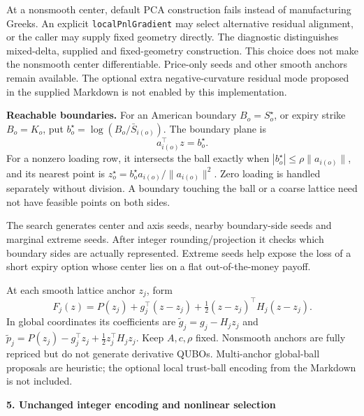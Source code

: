 \documentclass[11pt,a4paper]{article}
\begin{document}
At a nonsmooth center, default PCA construction fails instead of manufacturing
Greeks. An explicit \texttt{localPnlGradient} may select alternative residual
alignment, or the caller may supply fixed geometry directly. The diagnostic
distinguishes mixed-delta, supplied and fixed-geometry construction. This choice
does not make the nonsmooth center differentiable. Price-only seeds and other
smooth anchors remain available. The optional extra negative-curvature residual
mode proposed in the supplied Markdown is not enabled by this implementation.

\textbf{Reachable boundaries.}
For an American boundary $B_o=S_o^\star$, or expiry strike $B_o=K_o$, put
$b_o^\star=\log(B_o/\bar S_{i(o)})$. The boundary plane is
\[
 a_{i(o)}^\top z=b_o^\star.
\]
For a nonzero loading row, it intersects the ball exactly when
$|b_o^\star|\leq\rho\|a_{i(o)}\|$, and its nearest point is
$z_o^\star=b_o^\star a_{i(o)}/\|a_{i(o)}\|^2$.
Zero loading is handled separately without division. A boundary touching the
ball or a coarse lattice need not have feasible points on both sides.

The search generates center and axis seeds, nearby boundary-side seeds and
marginal extreme seeds. After integer rounding/projection it checks which
boundary sides are actually represented. Extreme seeds help expose the loss
of a short expiry option whose center lies on a flat out-of-the-money payoff.

At each smooth lattice anchor $z_j$, form
\[
 F_j(z)=P(z_j)+g_j^\top(z-z_j)+\tfrac12(z-z_j)^\top H_j(z-z_j).
\]
In global coordinates its coefficients are
$\widetilde g_j=g_j-H_jz_j$ and
$\widetilde p_j=P(z_j)-g_j^\top z_j+\tfrac12z_j^\top H_jz_j$.
Keep $A,c,\rho$ fixed. Nonsmooth anchors are fully repriced but do not generate
derivative QUBOs. Multi-anchor global-ball proposals are heuristic; the optional
local trust-ball encoding from the Markdown is not included.

\newpage
\textbf{5. Unchanged integer encoding and nonlinear selection}
\end{document}
